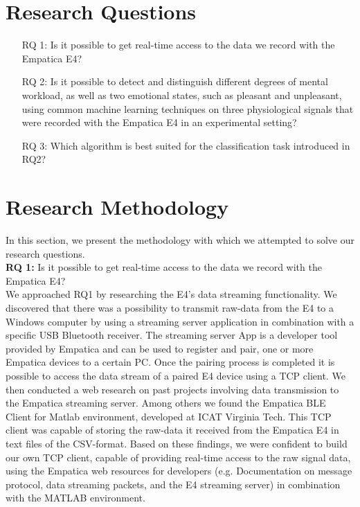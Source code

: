 \section{Research Questions}
\begin{center}
\begin{enumerate}
\item[RQ 1:] Is it possible to get real-time access to the data we record with the Empatica E4?
\item[RQ 2:] Is it possible to detect and distinguish different degrees of mental workload, as well as two emotional states, such as pleasant and unpleasant, using common machine learning techniques on three physiological signals that were recorded with the Empatica E4 in an experimental setting?
\item[RQ 3:] Which algorithm is best suited for the classification task introduced in RQ2?
\end{enumerate}
\end{center}
\section{Research Methodology}
In this section, we present the methodology with which we attempted to solve our research questions.\\[10pt]
 
\textbf{RQ 1:} Is it possible to get real-time access to the data we record with the Empatica E4?\\[10pt]
We approached RQ1 by researching the E4's data streaming functionality. We discovered that there was a possibility to transmit raw-data from the E4 to a Windows computer by using a streaming server application in combination with a specific USB Bluetooth receiver. The streaming server App is a developer tool provided by Empatica and can be used to register and pair, one or more Empatica devices to a certain PC. Once the pairing process is completed it is possible to access the data stream of a paired E4 device using a TCP client. We then conducted a web research on past projects involving data transmission to the Empatica streaming server. Among others we found the Empatica BLE Client for Matlab environment, developed at ICAT Virginia Tech. This TCP client was capable of storing the raw-data it received from the Empatica E4 in text files of the CSV-format. Based on these findings, we were confident to build our own TCP client, capable of providing real-time access to the raw signal data, using the Empatica web resources for developers (e.g. Documentation on message protocol, data streaming packets, and the E4 streaming server) in combination with the MATLAB environment. 
 
